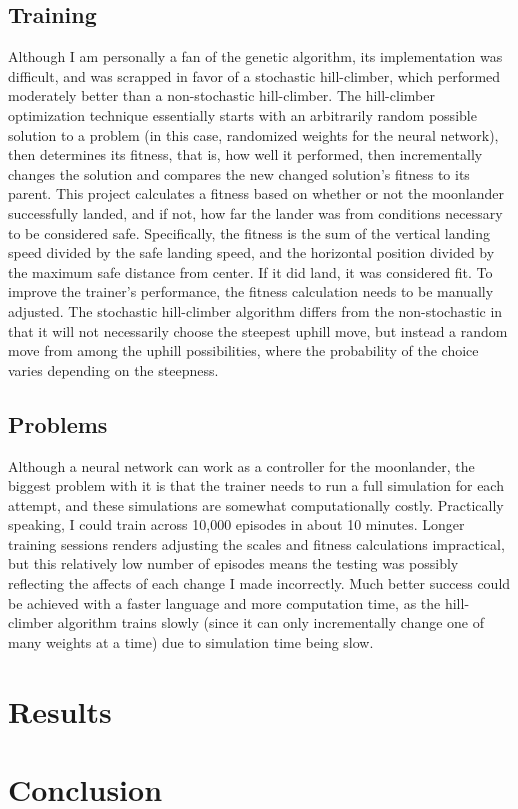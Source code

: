 \documentclass[12pt, article]{scrartcl}
\begin{document}
\subsection{Training}
Although I am personally a fan of the genetic algorithm, its implementation was difficult, and was scrapped in favor of a stochastic hill-climber, which performed moderately better than a non-stochastic hill-climber. The hill-climber optimization technique essentially starts with an arbitrarily random possible solution to a problem (in this case, randomized weights for the neural network), then determines its fitness, that is, how well it performed, then incrementally changes the solution and compares the new changed solution's fitness to its parent. This project calculates a fitness based on whether or not the moonlander successfully landed, and if not, how far the lander was from conditions necessary to be considered safe. Specifically, the fitness is the sum of the vertical landing speed divided by the safe landing speed, and the horizontal position divided by the maximum safe distance from center. If it did land, it was considered fit. To improve the trainer's performance, the fitness calculation needs to be manually adjusted. The stochastic hill-climber algorithm differs from the non-stochastic in that it will not necessarily choose the steepest uphill move, but instead a random move from among the uphill possibilities, where the probability of the choice varies depending on the steepness.
\subsection{Problems}
Although a neural network can work as a controller for the moonlander, the biggest problem with it is that the trainer needs to run a full simulation for each attempt, and these simulations are somewhat computationally costly. Practically speaking, I could train across 10,000 episodes in about 10 minutes. Longer training sessions renders adjusting the scales and fitness calculations impractical, but this relatively low number of episodes means the testing was possibly reflecting the affects of each change I made incorrectly. Much better success could be achieved with a faster language and more computation time, as the hill-climber algorithm trains slowly (since it can only incrementally change one of many weights at a time) due to simulation time being slow.
\section{Results}
\section{Conclusion}
\end{document}
